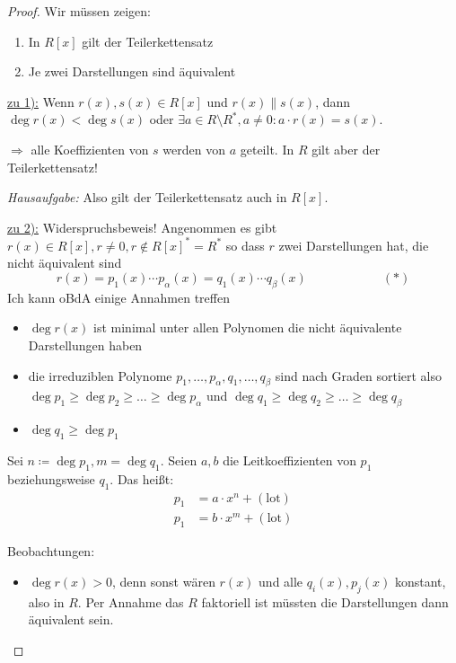 \documentclass[12pt,parskip=full]{scrartcl}
\newcommand{\heading}{\underline}
\theoremstyle{definition}
\theoremstyle{remark}
\begin{document}
	\begin{proof}
		Wir müssen zeigen:
		\begin{enumerate}
			\item In $R[x]$ gilt der Teilerkettensatz
			\item Je zwei Darstellungen sind äquivalent
		\end{enumerate}
	
		\heading{zu 1):} Wenn $r(x),s(x) \in R[x]$ und $r(x) \parallel s(x)$, dann $\deg r(x) < \deg s(x)$ oder $\exists a \in R \setminus R^*, a \neq 0: a \cdot r(x) = s(x)$.
		
		$\Rightarrow$ alle Koeffizienten von $s$ werden von $a$ geteilt. In $R$ gilt aber der Teilerkettensatz!
		
		\textit{Hausaufgabe:} Also gilt der Teilerkettensatz auch in $R[x]$.
		
		\heading{zu 2):} Widerspruchsbeweis! Angenommen es gibt $r(x) \in R[x], r \neq 0, r \notin R[x]^* = R^*$ so dass $r$ zwei Darstellungen hat, die nicht äquivalent sind
		\begin{equation*}
			r(x) = p_1(x) \cdots p_\alpha(x) = q_1(x) \cdots q_\beta(x) \qquad\qquad\qquad (*)
		\end{equation*}
		Ich kann oBdA einige Annahmen treffen
		\begin{itemize}
			\item $\deg r(x)$ ist minimal unter allen Polynomen die nicht äquivalente Darstellungen haben
			\item die irreduziblen Polynome $p_1, \dots, p_\alpha, q_1, \dots, q_\beta$ sind nach Graden sortiert also $\deg p_1 \geq \deg p_2 \geq \dots \geq \deg p_\alpha$ und $\deg q_1 \geq \deg q_2 \geq \dots \geq \deg q_\beta$
			\item $\deg q_1 \geq \deg p_1$
		\end{itemize}
	
		Sei $n \coloneqq \deg p_1, m = \deg q_1$. Seien $a,b$ die Leitkoeffizienten von $p_1$ beziehungsweise $q_1$. Das heißt:
		\begin{align*}
			p_1 &= a \cdot x^n + (\text{lot}) \\
			p_1 &= b \cdot x^m + (\text{lot})
		\end{align*}
		
		Beobachtungen:
		\begin{itemize}
			\item $\deg r(x) > 0$, denn sonst wären $r(x)$ und alle $q_i(x), p_j(x)$ konstant, also in $R$. Per Annahme das $R$ faktoriell ist müssten die Darstellungen dann äquivalent sein.
			

\end{itemize}
\end{proof}
\end{document}
